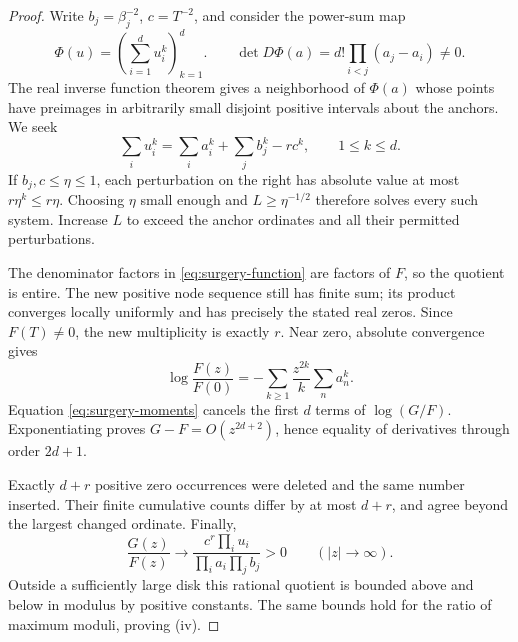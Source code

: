 \begin{proof}
Write \(b_j=\beta_j^{-2}\), \(c=T^{-2}\), and consider the power-sum map
\[
 \Phi(u)=\left(\sum_{i=1}^d u_i^k\right)_{k=1}^d.
 \qquad
 \det D\Phi(a)=d!\prod_{i<j}(a_j-a_i)\ne0.
\]
The real inverse function theorem gives a neighborhood of \(\Phi(a)\)
whose points have preimages in arbitrarily small disjoint positive intervals
about the anchors. We seek
\begin{equation}
 \sum_i u_i^k=\sum_i a_i^k+\sum_j b_j^k-r c^k,
 \qquad 1\le k\le d.
 \label{eq:surgery-moments}
\end{equation}
If \(b_j,c\le\eta\le1\), each perturbation on the right has absolute
value at most \(r\eta^k\le r\eta\). Choosing \(\eta\) small enough and
\(L\ge\eta^{-1/2}\) therefore solves every such system. Increase \(L\)
to exceed the anchor ordinates and all their permitted perturbations.

The denominator factors in \eqref{eq:surgery-function} are factors of
\(F\), so the quotient is entire. The new positive node sequence still
has finite sum; its product converges locally uniformly and has precisely
the stated real zeros. Since \(F(T)\ne0\), the new multiplicity is exactly
\(r\). Near zero, absolute convergence gives
\[
 \log\frac{F(z)}{F(0)}
   =-\sum_{k\ge1}\frac{z^{2k}}k\sum_n a_n^k.
\]
Equation \eqref{eq:surgery-moments} cancels the first \(d\) terms of
\(\log(G/F)\). Exponentiating proves \(G-F=O(z^{2d+2})\), hence equality
of derivatives through order \(2d+1\).

Exactly \(d+r\) positive zero occurrences were deleted and the same number
inserted. Their finite cumulative counts differ by at most \(d+r\), and
agree beyond the largest changed ordinate. Finally,
\[
 \frac{G(z)}{F(z)}\longrightarrow
 \frac{c^r\prod_i u_i}{\prod_i a_i\prod_j b_j}>0
 \qquad(|z|\to\infty).
\]
Outside a sufficiently large disk this rational quotient is bounded above
and below in modulus by positive constants. The same bounds hold for the
ratio of maximum moduli, proving \textup{(iv)}.
\end{proof}

